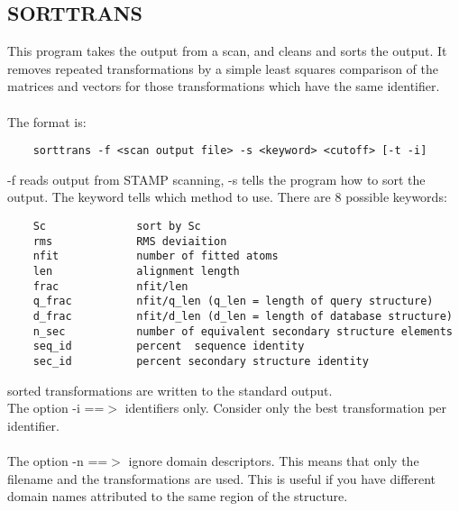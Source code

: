     \subsection{SORTTRANS}

    This program takes the output from a scan, and cleans and sorts the
    output.  It removes repeated transformations by a simple least 
    squares comparison of the matrices and vectors for those 
    transformations which have the same identifier.\\
    \\
    The format is:\\

    \begin{scriptsize}\begin{verbatim}
    sorttrans -f <scan output file> -s <keyword> <cutoff> [-t -i]
    \end{verbatim} \end{scriptsize}

    -f reads output from STAMP scanning, -s tells the program how to 
    sort the output.  The keyword tells which method to use.  There
    are 8 possible keywords:\\

    \begin{scriptsize}\begin{verbatim}
    Sc              sort by Sc
    rms             RMS deviaition
    nfit            number of fitted atoms
    len             alignment length
    frac            nfit/len
    q_frac          nfit/q_len (q_len = length of query structure)
    d_frac          nfit/d_len (d_len = length of database structure)
    n_sec           number of equivalent secondary structure elements
    seq_id          percent  sequence identity
    sec_id          percent secondary structure identity
    \end{verbatim} \end{scriptsize}

    sorted transformations are written to the standard output.
    \\
    The option -i ==$>$ identifiers only.  Consider only the best
    transformation per identifier.\\
    \\
    The option -n ==$>$ ignore domain descriptors.  This means
    that only the filename and the transformations are used.  This is
    useful if you have different domain names attributed to the same 
    region of the structure.  


